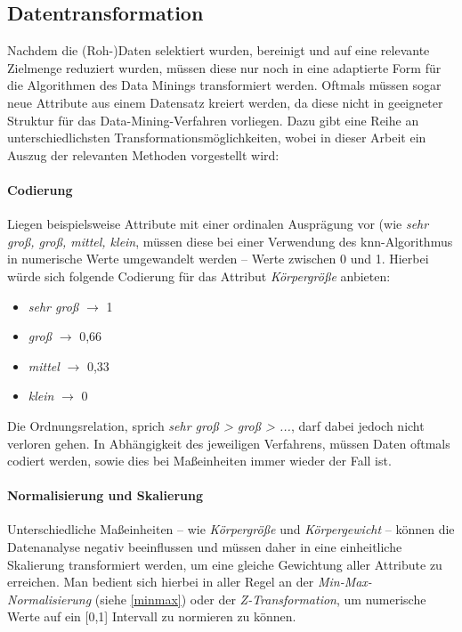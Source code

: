 \subsection{Datentransformation}
Nachdem die (Roh-)Daten selektiert wurden, bereinigt und auf eine relevante Zielmenge reduziert wurden, müssen diese nur noch in eine adaptierte Form für die Algorithmen des Data Minings transformiert werden. Oftmals müssen sogar neue Attribute aus einem Datensatz kreiert werden, da diese nicht in geeigneter Struktur für das Data-Mining-Verfahren vorliegen. Dazu gibt eine Reihe an unterschiedlichsten Transformationsmöglichkeiten, wobei in dieser Arbeit ein Auszug der relevanten Methoden vorgestellt wird:

\paragraph{Codierung}
Liegen beispielsweise Attribute mit einer ordinalen Ausprägung vor (wie \textit{sehr groß, groß, mittel, klein}, müssen diese bei einer Verwendung des \gls{knn}-Algorithmus in numerische Werte umgewandelt werden -- Werte zwischen 0 und 1. Hierbei würde sich folgende Codierung für das Attribut \textit{Körpergröße} anbieten:

\begin{itemize}
\item \textit{sehr groß} $\rightarrow$ 1
\item \textit{groß} $\rightarrow$ 0,66
\item \textit{mittel} $\rightarrow$ 0,33
\item \textit{klein} $\rightarrow$ 0
\end{itemize}

Die Ordnungsrelation, sprich \textit{sehr groß > groß > ...}, darf dabei jedoch nicht verloren gehen. In Abhängigkeit des jeweiligen Verfahrens, müssen Daten oftmals codiert werden, sowie dies bei Maßeinheiten immer wieder der Fall ist.

\paragraph{Normalisierung und Skalierung}
Unterschiedliche Maßeinheiten -- wie \textit{Körpergröße} und \textit{Körpergewicht} -- können die Datenanalyse negativ beeinflussen und müssen daher in eine einheitliche Skalierung transformiert werden, um eine gleiche Gewichtung aller Attribute zu erreichen. Man bedient sich hierbei in aller Regel an der \textit{Min-Max-Normalisierung} (siehe \vref{minmax}) oder der \textit{Z-Transformation}, um numerische Werte auf ein [0,1] Intervall zu normieren zu können.

